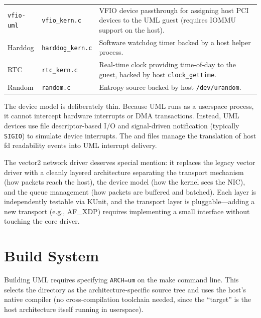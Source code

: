 \begin{table}[ht]
\begin{tabularx}{\textwidth}{l l Y}
\texttt{vfio-uml} &
  \texttt{vfio\_kern.c} &
  VFIO device passthrough for assigning host PCI devices to the UML guest
  (requires IOMMU support on the host). \\

Harddog &
  \texttt{harddog\_kern.c} &
  Software watchdog timer backed by a host helper process. \\

RTC &
  \texttt{rtc\_kern.c} &
  Real-time clock providing time-of-day to the guest, backed by host
  \texttt{clock\_gettime}. \\

Random &
  \texttt{random.c} &
  Entropy source backed by host \texttt{/dev/urandom}. \\
\bottomrule
\end{tabularx}
\end{table}

The device model is deliberately thin.  Because UML runs as a userspace process,
it cannot intercept hardware interrupts or DMA transactions.  Instead, UML
devices use file descriptor-based I/O and signal-driven notification
(typically \texttt{SIGIO}) to simulate device interrupts.  The
 and  files
manage the translation of host fd readability events into UML interrupt
delivery.

The vector2 network driver deserves special mention: it replaces the legacy
vector driver with a cleanly layered architecture separating the transport
mechanism (how packets reach the host), the device model (how the kernel sees
the NIC), and the queue management (how packets are buffered and batched).
Each layer is independently testable via KUnit, and the transport layer is
pluggable---adding a new transport (e.g., AF\_XDP) requires implementing a
small interface without touching the core driver.


\section{Build System}
\label{sec:build-system}

Building UML requires specifying \texttt{ARCH=um} on the make command line.
This selects the  directory as the architecture-specific
source tree and uses the host's native compiler (no cross-compilation toolchain
needed, since the ``target'' is the host architecture itself running in
userspace).


